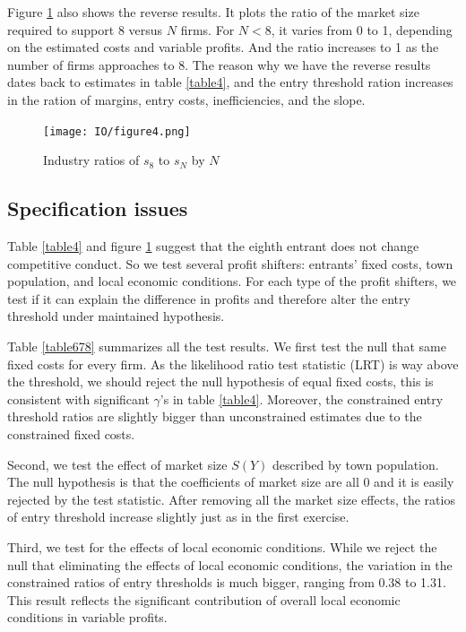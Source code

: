 \documentclass[a4paper,11pt]{article}
\begin{document}
Figure \ref{figure4} also shows the reverse results. It plots the ratio of the market size required to support 8 versus $N$ firms. For $N<8$, it varies from 0 to 1, depending on the estimated costs and variable profits. And the ratio increases to 1 as the number of firms approaches to 8. The reason why we have the reverse results dates back to estimates in table \ref{table4}, and the entry threshold ration increases in the ration of margins, entry costs, inefficiencies, and the slope.

\begin{figure}[ht]
    \centering
    \texttt{[image: IO/figure4.png]}
    \caption{Industry ratios of $s_8$ to $s_N$ by $N$}
    \label{figure4}
\end{figure}


\subsection{Specification issues}
Table \ref{table4} and figure \ref{figure4} suggest that the eighth entrant does not change competitive conduct. So we test several profit shifters: entrants' fixed costs, town population, and local economic conditions. For each type of the profit shifters, we test if it can explain the difference in profits and therefore alter the entry threshold under maintained hypothesis.

Table \ref{table678} summarizes all the test results. We first test the null that same fixed costs for every firm. As the likelihood ratio test statistic (LRT) is way above the threshold, we should reject the null hypothesis of equal fixed costs, this is consistent with significant $\gamma$'s in table \ref{table4}. Moreover, the constrained entry threshold ratios are slightly bigger than unconstrained estimates due to the constrained fixed costs.

Second, we test the effect of market size $S(Y)$ described by town population. The null hypothesis is that the coefficients of market size are all 0 and it is easily rejected by the test statistic. After removing all the market size effects, the ratios of entry threshold increase slightly just as in the first exercise.

Third, we test for the effects of local economic conditions. While we reject the null that eliminating the effects of local economic conditions, the variation in the constrained ratios of entry thresholds is much bigger, ranging from 0.38 to 1.31. This result reflects the significant contribution of overall local economic conditions in variable profits. 
\end{document}
